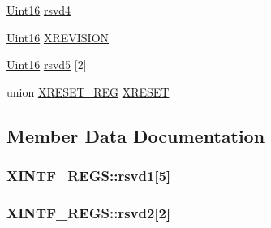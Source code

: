 \begin{DoxyCompactItemize}
\item 
\hyperlink{_d_s_p2833x___device_8h_a59a9f6be4562c327cbfb4f7e8e18f08b}{Uint16} \hyperlink{struct_x_i_n_t_f___r_e_g_s_a75a3b59bdb62fb361a3445ea8a42127c}{rsvd4}
\item 
\hyperlink{_d_s_p2833x___device_8h_a59a9f6be4562c327cbfb4f7e8e18f08b}{Uint16} \hyperlink{struct_x_i_n_t_f___r_e_g_s_afbfc06e0b3afe21c1f721fb4ba8c580b}{X\+R\+E\+V\+I\+S\+I\+O\+N}
\item 
\hyperlink{_d_s_p2833x___device_8h_a59a9f6be4562c327cbfb4f7e8e18f08b}{Uint16} \hyperlink{struct_x_i_n_t_f___r_e_g_s_afa7ebe71510d22015e1a3783aaa9a6d2}{rsvd5} \mbox{[}2\mbox{]}
\item 
union \hyperlink{union_x_r_e_s_e_t___r_e_g}{X\+R\+E\+S\+E\+T\+\_\+\+R\+E\+G} \hyperlink{struct_x_i_n_t_f___r_e_g_s_ac345ccf4fe9f87cba59e6bd4a6516f99}{X\+R\+E\+S\+E\+T}
\end{DoxyCompactItemize}


\subsection{Member Data Documentation}
\hypertarget{struct_x_i_n_t_f___r_e_g_s_ad408511b2878bcea4444f2fd04afe736}{}
\subsubsection[{rsvd1}]{ X\+I\+N\+T\+F\+\_\+\+R\+E\+G\+S\+::rsvd1\mbox{[}5\mbox{]}}\label{struct_x_i_n_t_f___r_e_g_s_ad408511b2878bcea4444f2fd04afe736}
\hypertarget{struct_x_i_n_t_f___r_e_g_s_ab63d62cacb96c44ba73e03a176c5f42c}{}
\subsubsection[{rsvd2}]{ X\+I\+N\+T\+F\+\_\+\+R\+E\+G\+S\+::rsvd2\mbox{[}2\mbox{]}}\label{struct_x_i_n_t_f___r_e_g_s_ab63d62cacb96c44ba73e03a176c5f42c}
\hypertarget{struct_x_i_n_t_f___r_e_g_s_ac95b0b29961cac47cc52086232501ebf}{}
